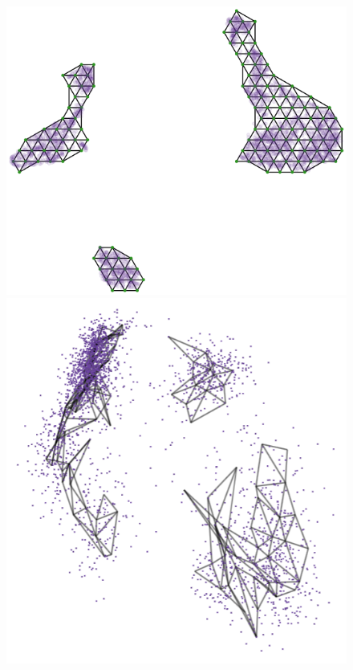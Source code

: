\documentclass[
  12pt]{article}
\begin{document}
\begin{figure}[H]

\begin{minipage}{0.25\linewidth}
\includegraphics{figures/pbmc3k/umap_trimesh_plot.png}\end{minipage}%
%
\begin{minipage}{0.25\linewidth}
\includegraphics{figures/pbmc3k/sc_1.png}\end{minipage}%

\end{figure}
\end{document}
